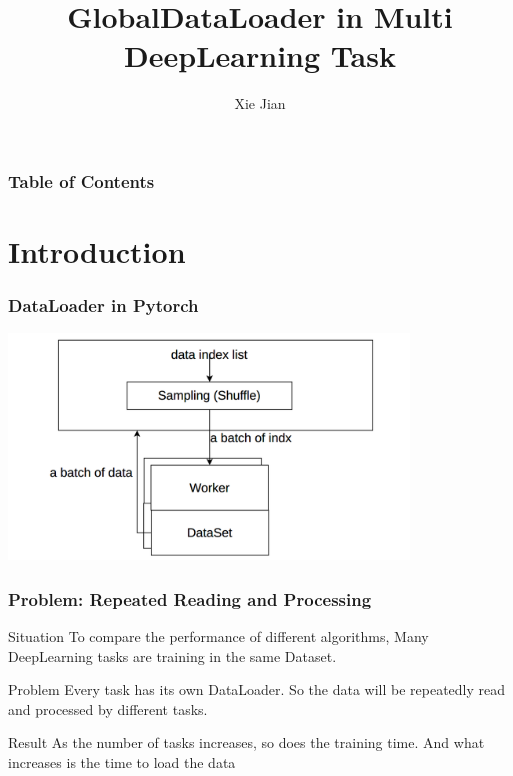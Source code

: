 \documentclass[notheorems, aspectratio=54]{beamer}
\title[GlobalDataLoader in Multi DeepLearning Task]{GlobalDataLoader in Multi DeepLearning Task}
\author{Xie Jian}
\institute[]{I2EC, ICS, NJU}
\begin{document}
\begin{frame}
    \titlepage
\end{frame}


\begin{frame}
    \frametitle{Table of Contents}
    \tableofcontents
\end{frame}

\section{Introduction}
\begin{frame}
    \frametitle{DataLoader in Pytorch}
    \begin{center}
        \includegraphics[height=6cm]{global_img_dir/2021-03-02_15-33.png}
    \end{center}
\end{frame}

\begin{frame}
    \frametitle{Problem: Repeated Reading and Processing}
    \begin{block}{Situation}
        To compare the performance of different algorithms, Many DeepLearning tasks are training in the same Dataset.
    \end{block}
    \begin{block}{Problem}
        Every task has its own DataLoader. So the data will be repeatedly read and processed by different tasks.
    \end{block}
    \begin{block}{Result}
        As the number of tasks increases, so does the training time. And what increases is the time to load the data
    \end{block}
\end{frame}
\end{document}
